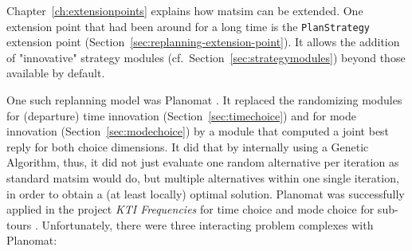 Chapter~\ref{ch:extensionpoints} explains how \gls{matsim} can be extended.  One extension point that had been around for a long time is the \lstinline{PlanStrategy} extension point (Section~\ref{sec:replanning-extension-point}). It allows the addition of "innovative" strategy modules (cf.\ Section~\ref{sec:strategymodules}) beyond those available by default.

One such replanning model was Planomat \citep[][]{MeisterEtAl_IATBR_2006, MeisterEtAl_STRC_2006, Meister_PhDThesis_2011}. It replaced the randomizing modules for (departure) time innovation (Section~\ref{sec:timechoice}) and for mode innovation (Section~\ref{sec:modechoice}) by a module that computed a joint best reply for both choice dimensions. It did that by internally using a Genetic Algorithm, thus, it did not just evaluate one random alternative per iteration as standard \gls{matsim} would do, but multiple alternatives within one single iteration, in order to obtain a (at least locally) optimal solution. Planomat was successfully applied in the project \emph{KTI Frequencies} for time choice and mode choice for sub-tours \citep[][p.10]{BalmerEtAl_ResRep_datapuls_2010}.
Unfortunately, there were three interacting problem complexes with Planomat:
